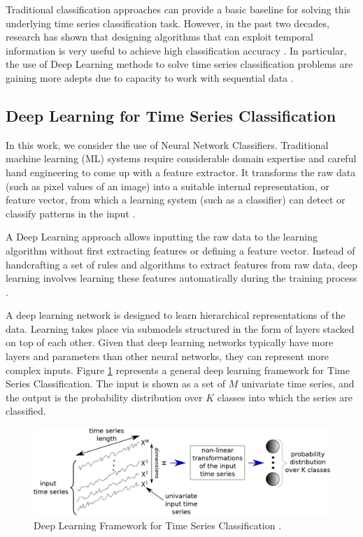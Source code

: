 Traditional classification approaches can provide a basic baseline for solving this underlying time series classification task. However, in the past two decades, research has shown that designing algorithms that can exploit temporal information is very useful to achieve high classification accuracy \cite{Wang2017}. In particular, the use of Deep Learning methods to solve time series classification problems are gaining more adepts due to capacity to work with sequential data \cite{Bagnall2017a, Zhao2017, Zebik2017}.

\subsection{Deep Learning for Time Series Classification}
\label{Sec:DL-TSC}
In this work, we consider the use of Neural Network Classifiers. Traditional machine learning (ML) systems require considerable domain expertise and careful hand engineering to come up with a feature extractor. It transforms the raw data (such as pixel values of an image) into a suitable internal representation, or feature vector, from which a learning system (such as a classifier) can detect or classify patterns in the input \cite{Guyon2006}. 

A Deep Learning approach allows inputting the raw data to the learning algorithm without first extracting features or defining a feature vector. Instead of handcrafting a set of rules and algorithms to extract features from raw data, deep learning involves learning these features automatically during the training process \cite{Goodfellow2016, Schmidhuber2015}. 

A deep learning network is designed to learn hierarchical representations of the data. Learning takes place via submodels structured in the form of layers stacked on top of each other. Given that deep learning networks typically have more layers and parameters than other neural networks, they can represent more complex inputs. Figure \ref{Fig:TSC-Fawaz} represents a general deep learning framework for Time Series Classification. The input is shown as a set of $M$ univariate time series, and the output is the probability distribution over $K$ classes into which the series are classified.

\begin{figure}[htb]
 	\centering
 	\includegraphics[scale=0.5]{../Figures/TSC_Fawaz}
 	\caption{Deep Learning Framework for Time Series Classification \cite{Fawaz2019}.}
 	\label{Fig:TSC-Fawaz}
\end{figure}

